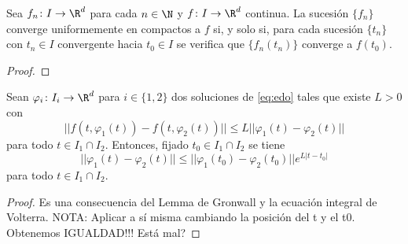 \documentclass{article}
\begin{document}
\begin{proposition}
  Sea $f_n \colon I \to \R^d$ para cada $n \in \N$ y $f \colon I \to \R^d$ continua. La sucesión
  $\{f_n\}$ converge uniformemente en compactos a $f$ si, y solo si, para cada sucesión $\{t_n\}$
  con $t_n \in I$ convergente hacia $t_0 \in I$ se verifica que $\{f_n(t_n)\}$ converge a $f(t_0)$.
\end{proposition}
\begin{proof}
\end{proof}

\begin{lemma}
  Sean $\varphi_i \colon I_i \to \R^d$ para $i \in \{1,2\}$ dos soluciones de \eqref{eq:edo} tales
  que existe $L > 0$ con
  \[ ||f(t, \varphi_1(t))-f(t, \varphi_2(t))|| \le L ||\varphi_1(t)-\varphi_2(t)|| \] para todo
  $t\in I_1\cap I_2$. Entonces, fijado $t_0 \in I_1\cap I_2$ se tiene
  \[ ||\varphi_1(t)-\varphi_2(t)|| \le ||\varphi_1(t_0)-\varphi_2(t_0)|| e^{L|t-t_0|} \] para todo
  $t\in I_1\cap I_2$.
\end{lemma}
\begin{proof}
  Es una consecuencia del Lemma de Gronwall y la ecuación integral de Volterra.
  NOTA: Aplicar a sí misma cambiando la posición del t y el t0. Obtenemos IGUALDAD!!! Está mal?
\end{proof}
\end{document}
